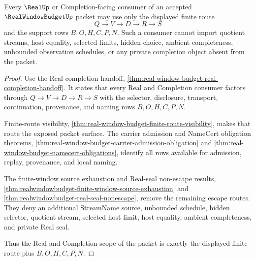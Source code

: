 \begin{theorem}
\label{thm:realwindowbudget-real-completion-scope}
Every $\RealUp$ or Completion-facing consumer of an accepted
$\RealWindowBudgetUp$ packet may use only the displayed finite route
$$
Q \to V \to D \to R \to S
$$
and the support rows $B,O,H,C,P,N$. Such a consumer cannot import quotient
streams, host equality, selected limits, hidden choice, ambient completeness,
unbounded observation schedules, or any private completion object absent from
the packet.
\end{theorem}
\begin{proof}
Use the Real-completion handoff,
\autoref{thm:real-window-budget-real-completion-handoff}. It states that
every Real and Completion consumer factors through
$Q \to V \to D \to R \to S$ with the selector, disclosure, transport,
continuation, provenance, and naming rows $B,O,H,C,P,N$.

Finite-route visibility, \autoref{thm:real-window-budget-finite-route-visibility},
makes that route the exposed packet surface. The carrier admission and
NameCert obligation theorems, \autoref{thm:real-window-budget-carrier-admission-obligation}
and \autoref{thm:real-window-budget-namecert-obligations}, identify all rows
available for admission, replay, provenance, and local naming.

The finite-window source exhaustion and Real-seal non-escape results,
\autoref{thm:realwindowbudget-finite-window-source-exhaustion} and
\autoref{thm:realwindowbudget-real-seal-nonescape}, remove the remaining
escape routes. They deny an additional StreamName source, unbounded schedule,
hidden selector, quotient stream, selected host limit, host equality,
ambient completeness, and private Real seal.

Thus the Real and Completion scope of the packet is exactly the displayed
finite route plus $B,O,H,C,P,N$.
\end{proof}

